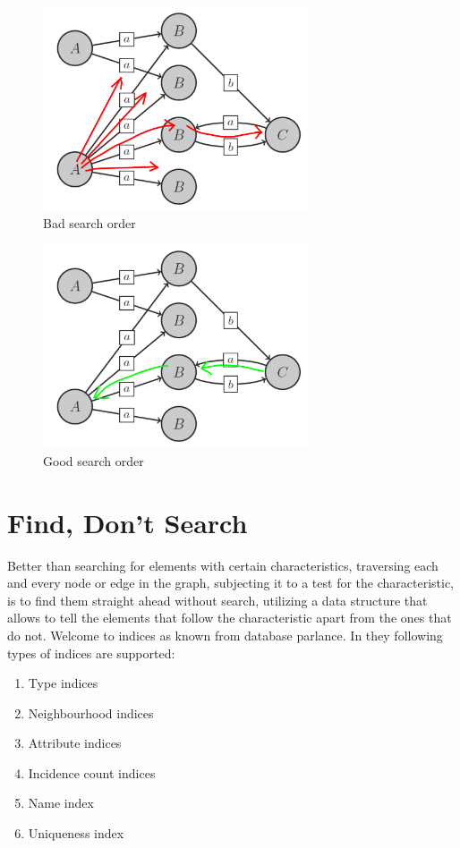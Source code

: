 \begin{figure}[p]
  \centering
  \includegraphics[width=0.7\textwidth]{fig/GraphBad}
  \caption{Bad search order}
  \label{perf:figbadsearch}
\end{figure}

\begin{figure}[p]
  \centering
  \includegraphics[width=0.7\textwidth]{fig/GraphGood}
  \caption{Good search order}
  \label{perf:figgoodsearch}
\end{figure}


\section{Find, Don't Search}
Better than searching for elements with certain characteristics, 
traversing each and every node or edge in the graph, 
subjecting it to a test for the characteristic,
is to find them straight ahead without search,
utilizing a data structure that allows to tell the elements that follow the characteristic apart from the ones that do not.
Welcome to indices as known from database parlance.
In \GrG{} they following types of indices are supported:
\begin{enumerate}
	\item Type indices
	\item Neighbourhood indices
	\item Attribute indices
	\item Incidence count indices
	\item Name index
	\item Uniqueness index
\end{enumerate}

